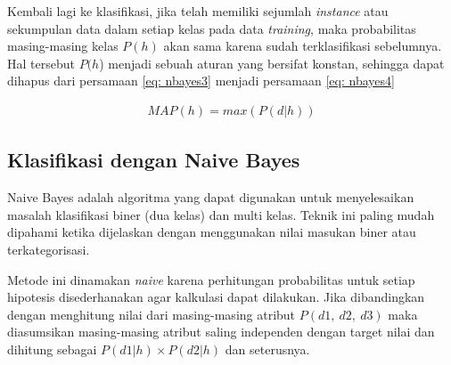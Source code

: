 Kembali lagi ke klasifikasi, jika telah memiliki sejumlah \textit{instance} atau sekumpulan data dalam setiap kelas pada data \textit{training}, maka probabilitas masing-masing kelas $P(h)$ akan sama karena sudah terklasifikasi sebelumnya. Hal tersebut $P(h$) menjadi sebuah aturan yang bersifat konstan, sehingga dapat dihapus dari persamaan \ref{eq: nbayes3} menjadi persamaan \ref{eq: nbayes4}

\begin{equation}\label{eq: nbayes4}
\begin{split}
MAP(h) = max(P(d|h))
\end{split}
\end{equation}
	
\subsection{Klasifikasi dengan Naive Bayes}
\label{sec:sub_sec2_class_bayes}
\vspace{1ex}

Naive Bayes adalah algoritma yang dapat digunakan untuk menyelesaikan masalah klasifikasi biner (dua kelas) dan multi kelas. Teknik ini paling mudah dipahami ketika dijelaskan dengan menggunakan nilai masukan biner atau terkategorisasi.
\vspace{1ex}

Metode ini dinamakan \textit{naive} karena perhitungan probabilitas untuk setiap hipotesis disederhanakan agar kalkulasi dapat dilakukan. Jika dibandingkan dengan menghitung nilai dari masing-masing atribut $P(d1,\ d2,\ d3)$ maka  diasumsikan masing-masing atribut saling independen dengan target nilai dan dihitung sebagai $P(d1|h) \times P(d2|h)$ dan seterusnya.
\vspace{1ex}

